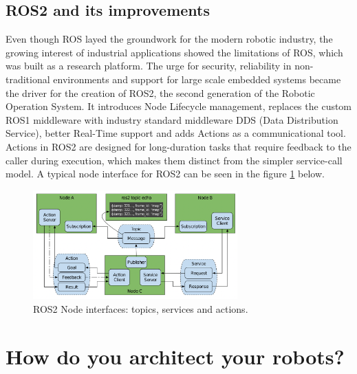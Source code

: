 \documentclass[%
paper=A4,               %
twoside=true,           %
openright,              %
11pt,                   %
bibliography=totoc,     %
titlepage=on,           %
DIV=12,                 %
BCOR=1.5cm,             %
parskip=half,            %
final
]{scrreprt}
\begin{document}
	\subsection{ROS2 and its improvements}
	Even though ROS layed the groundwork for the modern robotic industry, the growing interest of industrial applications showed the limitations of ROS, which was built as a research platform. The urge for security, reliability in non-traditional environments and support for large scale embedded systems became the driver for the creation of ROS2, the second generation of the Robotic Operation System. \autocite{macenskiRobotOperatingSystem2022} 
	It introduces Node Lifecycle management, replaces the custom ROS1 middleware with industry standard middleware DDS (Data Distribution Service), better Real-Time support and adds Actions as a communicational tool. Actions in ROS2 are designed for long-duration tasks that require feedback to the caller during execution, which makes them distinct from the simpler service-call model.  \autocite{macenskiRobotOperatingSystem2022} A typical node interface for ROS2 can be seen in the figure \ref{fig: fig5} below. 
	
	\begin{figure}[ht]
		\centering
		\includegraphics[width=0.7\textwidth]{Graphics/ROS2}
		\caption{ROS2 Node interfaces: topics, services and actions. \autocite{macenskiRobotOperatingSystem2022}}
		\label{fig: fig5}
	\end{figure}
	
	\section{How do you architect your robots?}
\end{document}
